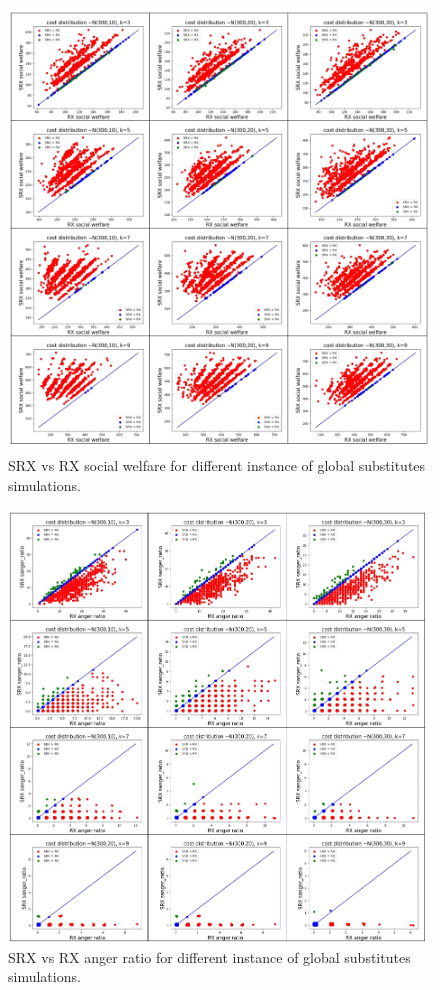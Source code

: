 \documentclass[runningheads]{llncs}
\begin{document}
\begin{subappendices}
\begin{figure}[t]
\begin{center}
\includegraphics[width=14cm]{simulation/constant_scatters_no_prob.png}
\caption{SRX vs RX social welfare for different instance of global substitutes simulations.
}\label{fig:scatter_all2}
\end{center}
\end{figure}

\begin{figure}[t]
\begin{center}
\includegraphics[width=14cm]{simulation/constant_scatters_ar.png}
\caption{SRX vs RX anger ratio for different instance of global substitutes simulations.
}\label{fig:scatter_all_ar2}
\end{center}
\end{figure}


\end{subappendices}
\end{document}
